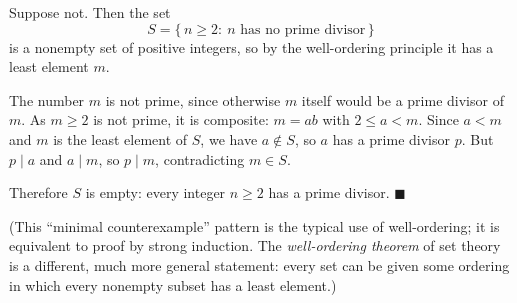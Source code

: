 Suppose not. Then the set
\[
S=\{\,n\ge2:\ n\text{ has no prime divisor}\,\}
\]
is a nonempty set of positive integers, so by the well-ordering principle it has a least element $m$.

The number $m$ is not prime, since otherwise $m$ itself would be a prime divisor of $m$. As $m\ge2$ is not prime, it is composite: $m=ab$ with $2\le a<m$. Since $a<m$ and $m$ is the least element of $S$, we have $a\notin S$, so $a$ has a prime divisor $p$. But $p\mid a$ and $a\mid m$, so $p\mid m$, contradicting $m\in S$.

Therefore $S$ is empty: every integer $n\ge2$ has a prime divisor. $\blacksquare$

(This ``minimal counterexample'' pattern is the typical use of well-ordering; it is equivalent to proof by strong induction. The \emph{well-ordering theorem} of set theory is a different, much more general statement: every set can be given some ordering in which every nonempty subset has a least element.)
